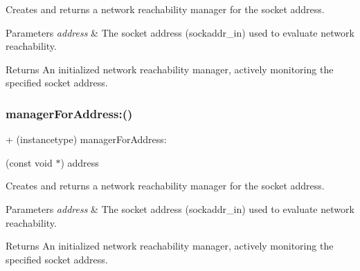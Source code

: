 Creates and returns a network reachability manager for the socket address.


\begin{DoxyParams}{Parameters}
{\em address} & The socket address ({\ttfamily sockaddr\+\_\+in}) used to evaluate network reachability.\\
\hline
\end{DoxyParams}
\begin{DoxyReturn}{Returns}
An initialized network reachability manager, actively monitoring the specified socket address. 
\end{DoxyReturn}
\mbox{\label{interface_a_f_network_reachability_manager_abcf59bed68830fd7440310b3772022f4}} 
\subsubsection{\texorpdfstring{manager\+For\+Address\+:()}{managerForAddress:()}\hspace{0.1cm}{\footnotesize\ttfamily [2/3]}}
{\footnotesize\ttfamily + (instancetype) manager\+For\+Address\+: \begin{DoxyParamCaption}\item[{(const void $\ast$)}]{address }\end{DoxyParamCaption}}

Creates and returns a network reachability manager for the socket address.


\begin{DoxyParams}{Parameters}
{\em address} & The socket address ({\ttfamily sockaddr\+\_\+in}) used to evaluate network reachability.\\
\hline
\end{DoxyParams}
\begin{DoxyReturn}{Returns}
An initialized network reachability manager, actively monitoring the specified socket address. 
\end{DoxyReturn}
\mbox{\label{interface_a_f_network_reachability_manager_abcf59bed68830fd7440310b3772022f4}} 
